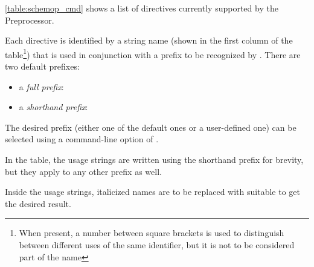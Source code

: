 \autoref{table:schemop_cmd} shows a list of directives currently
supported by the \ScheMo{} Preprocessor.

Each directive is identified by a string name (shown in the first
column of the table\footnote{When present, a number between square
brackets is used to distinguish between different uses of the same
identifier, but it is not to be considered part of the name}) that is
used in conjunction with a prefix to be recognized by .
There are two default prefixes:
\begin{itemize}
  \item a \textit{full prefix}: 
  \item a \textit{shorthand prefix}: 
\end{itemize}

The desired prefix (either one of the default ones or a user-defined
one) can be selected using a command-line option of .

In the table, the usage strings are written using the shorthand
prefix for brevity, but they apply to any other prefix as well.

Inside the usage strings, italicized names are to be replaced with
suitable to get the desired result. 

